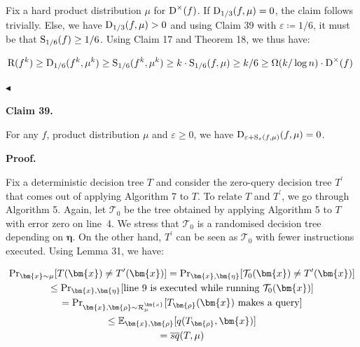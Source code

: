Fix a hard product distribution $\mu$ for ${\textup{D}}^{\times}(f)$. If ${\textup{D}}_{1/3}(f,\mu)=0$, the claim follows trivially. Else, we have ${\textup{D}}_{1/3}(f,\mu)>0$ and using Claim 39 with $\varepsilon\coloneqq 1/6$, it must be that ${\textup{S}}_{1/6}(f)\geq 1/6$. Using Claim 17 and Theorem 18, we thus have:\par


\[\begin{gathered}
{\textup{R}}(f^{k})\geq{\textup{D}}_{1/6}(f^{k},\mu^{k})\geq{\textup{S}}_{1/6}(f^{k},\mu^{k})\geq k\cdot{\textup{S}}_{1/6}(f,\mu)\geq k/6\geq\Omega(k/\log n)\cdot{\textup{D}}^{\times}(f)\
\end{gathered}\]


$\blacktriangleleft$\par





\par\medskip\noindent\textbf{
Claim 39. 
}\par



For any $f$, product distribution $\mu$ and $\varepsilon\geq 0$, we have ${\textup{D}}_{\varepsilon+{\textup{S}}_{\varepsilon}(f,\mu)}(f,\mu)=0$.\par







\par\medskip\noindent\textbf{
\textbf{Proof}.}\par




Fix a deterministic decision tree $T$ and consider the zero-query decision tree $T^{\prime}$ that comes out of applying Algorithm 7 to $T$. To relate $T$ and $T^{\prime}$, we go through Algorithm 5. Again, let $\mathcal{T}_{0}$ be the tree obtained by applying Algorithm 5 to $T$ with error zero on line 4. We stress that $\mathcal{T}_{0}$ is a randomised decision tree depending on $\bm{\eta}$. On the other hand, $T^{\prime}$ can be seen as $\mathcal{T}_{0}$ with fewer instructions executed. Using Lemma 31, we have:\par


\[\begin{gathered}
\displaystyle\Pr\nolimits_{\bm{x}\sim\mu}[T(\bm{x})\neq T^{\prime}(\bm{x})] \displaystyle=\Pr\nolimits_{\bm{x},\bm{\eta}}[\mathcal{T}_{0}(\bm{x})\neq T^{\prime}(\bm{x})] \\
\displaystyle\leq\Pr\nolimits_{\bm{x},\bm{\eta}}[\text{line\nobreak\ 9 is executed while running $\mathcal{T}_{0}(\bm{x})$}] \\
\displaystyle=\Pr\nolimits_{\bm{x},\bm{\rho}\sim\mathcal{R}^{\bm{x}}_{\mu}}[\text{$T_{\bm{\rho}}(\bm{x})$ makes a query}] \\
\displaystyle\leq\mathbb{E}_{\bm{x},\bm{\rho}}[q(T_{\bm{\rho}},\bm{x})] \\
\displaystyle=\mathop{\overline{sq}}(T,\mu)
\end{gathered}\]


